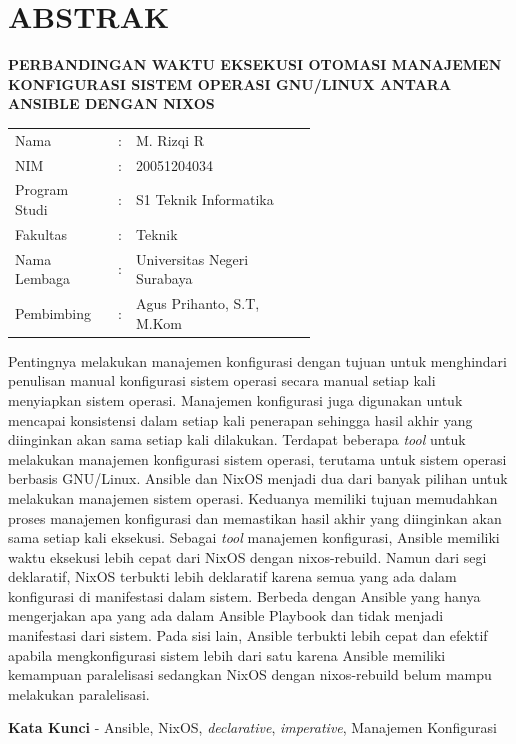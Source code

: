 \documentclass[10pt,]{report}
\begin{document}
\chapter*{ABSTRAK}
\begin{adjustwidth}{0.0cm}{}
	\begin{center}
		\textbf{PERBANDINGAN WAKTU EKSEKUSI OTOMASI MANAJEMEN KONFIGURASI SISTEM OPERASI GNU/LINUX ANTARA ANSIBLE DENGAN NIXOS}
	\end{center}
	\medskip
	\begin{adjustwidth}{0.0cm}{}
		\begin{tabular}{@{}lcp{0.6\linewidth}}
			Nama          & : & M. Rizqi R                  \\
			NIM           & : & 20051204034                 \\
			Program Studi & : & S1 Teknik Informatika       \\
			Fakultas      & : & Teknik                      \\
			Nama Lembaga  & : & Universitas Negeri Surabaya \\
			Pembimbing    & : & Agus Prihanto, S.T, M.Kom   \\
		\end{tabular}
	\end{adjustwidth}
	\medskip

	Pentingnya melakukan manajemen konfigurasi dengan tujuan untuk menghindari
	penulisan manual konfigurasi sistem operasi secara manual setiap kali
	menyiapkan sistem operasi. Manajemen konfigurasi juga digunakan untuk
	mencapai konsistensi dalam setiap kali penerapan sehingga hasil akhir yang
	diinginkan akan sama setiap kali dilakukan. Terdapat beberapa \textit{tool}
	untuk melakukan manajemen konfigurasi sistem operasi, terutama untuk sistem
	operasi berbasis GNU/Linux. Ansible dan NixOS menjadi dua dari banyak pilihan
	untuk melakukan manajemen sistem operasi. Keduanya memiliki tujuan memudahkan
	proses manajemen konfigurasi dan memastikan hasil akhir yang diinginkan akan
	sama setiap kali eksekusi. Sebagai \textit{tool} manajemen konfigurasi,
	Ansible memiliki waktu eksekusi lebih cepat dari NixOS dengan nixos-rebuild.
	Namun dari segi deklaratif, NixOS terbukti lebih deklaratif karena semua yang
	ada dalam konfigurasi di manifestasi dalam sistem. Berbeda dengan Ansible
	yang hanya mengerjakan apa yang ada dalam Ansible Playbook dan tidak menjadi
	manifestasi dari sistem. Pada sisi lain, Ansible terbukti lebih cepat dan
	efektif apabila mengkonfigurasi sistem lebih dari satu karena Ansible memiliki
	kemampuan paralelisasi sedangkan NixOS dengan nixos-rebuild belum mampu
	melakukan paralelisasi.
	\medskip

	\noindent\textbf{Kata Kunci} - Ansible, NixOS, \textit{declarative}, \textit{imperative},
	Manajemen Konfigurasi
\end{adjustwidth}
\newpage
\end{document}
